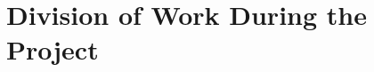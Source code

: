 \documentclass[sigconf]{acmart}
\begin{document}






\newpage
\appendix
\section{Division of Work During the Project}
\end{document}
